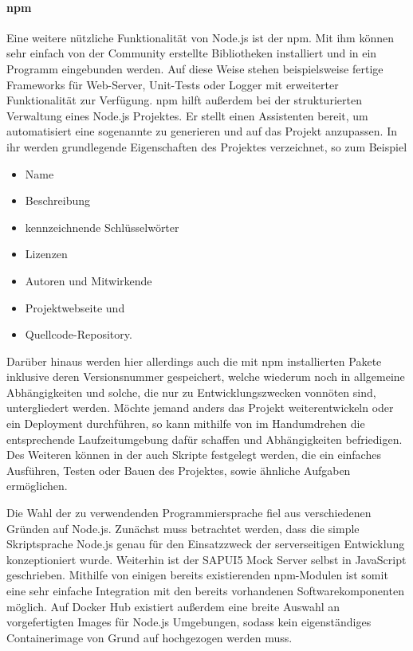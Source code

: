 \paragraph{\ac{npm}}
Eine weitere nützliche Funktionalität von Node.js ist der \acl{npm}.
Mit ihm können sehr einfach von der Community erstellte Bibliotheken installiert und in ein Programm eingebunden werden.
Auf diese Weise stehen beispielsweise fertige Frameworks für Web-Server, Unit-Tests oder Logger  mit erweiterter Funktionalität zur Verfügung.
\ac{npm} hilft außerdem bei der strukturierten Verwaltung eines Node.js Projektes.
Er stellt einen Assistenten bereit, um automatisiert eine sogenannte  zu generieren und auf das Projekt anzupassen.
In ihr werden grundlegende Eigenschaften des Projektes verzeichnet, so zum Beispiel
\begin{itemize}
	\item Name
	\item Beschreibung
	\item kennzeichnende Schlüsselwörter
	\item Lizenzen
	\item Autoren und Mitwirkende
	\item Projektwebseite und
	\item Quellcode-Repository.
\end{itemize}
Darüber hinaus werden hier allerdings auch die mit \ac{npm} installierten Pakete inklusive deren Versionsnummer gespeichert, welche wiederum noch in allgemeine Abhängigkeiten und solche, die nur zu Entwicklungszwecken vonnöten sind, untergliedert werden.
Möchte jemand anders das Projekt weiterentwickeln oder ein Deployment durchführen, so kann mithilfe von  im Handumdrehen die entsprechende Laufzeitumgebung dafür schaffen und Abhängigkeiten befriedigen.
Des Weiteren können in der  auch Skripte festgelegt werden, die ein einfaches Ausführen, Testen oder Bauen des Projektes, sowie ähnliche Aufgaben ermöglichen.~\cite{package.json}

Die Wahl der zu verwendenden Programmiersprache fiel aus verschiedenen Gründen auf Node.js.
Zunächst muss betrachtet werden, dass die simple Skriptsprache Node.js genau für den Einsatzzweck der serverseitigen Entwicklung konzeptioniert wurde.
Weiterhin ist der SAPUI5 Mock Server selbst in JavaScript geschrieben.
Mithilfe von einigen bereits existierenden \ac{npm}-Modulen ist somit eine sehr einfache Integration mit den bereits vorhandenen Softwarekomponenten möglich.
Auf Docker Hub existiert außerdem eine breite Auswahl an vorgefertigten Images für Node.js Umgebungen, sodass kein eigenständiges Containerimage von Grund auf hochgezogen werden muss.


